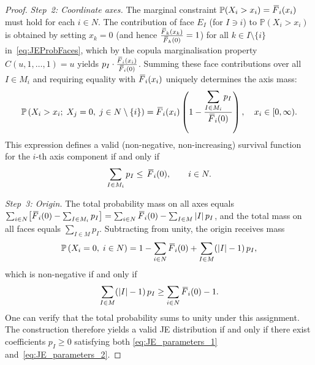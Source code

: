 \documentclass[letterpaper,12pt]{article}
\def \P {\mathbb{P}}
\numberwithin{equation}{section}
\newcommand{\N}{{N}}
\newcommand{\M}{{M}}
\newcommand{\I}{{I}}
\newcommand{\F}{\,\overline{\kern-0.175em F\kern-0em}}
\begin{document}
{\begin{proof}
\smallskip
\noindent\textit{Step~2: Coordinate axes.}
The marginal constraint $\P(X_i>x_i)=\F_i(x_i)$ must hold for each $i\in\N$.
The contribution of face $E_{\I}$ (for $\I\ni i$) to $\P(X_i>x_i)$ is obtained by
setting $x_k=0$ (and hence $\frac{\F_k(x_k)}{\F_k(0)}=1$) for all
$k\in\I\setminus\{i\}$ in~\eqref{eq:JEProbFaces}, which by the copula
marginalisation property $C(u,1,\dots,1)=u$ yields $p_\I\cdot\frac{\F_i(x_i)}{\F_i(0)}$.
Summing these face contributions over all $\I\in\M_i$ and requiring equality with
$\F_i(x_i)$ uniquely determines the axis mass:
\begin{equation}
\label{eq:JEProbAxes}
\P\left(X_i>x_i;\;X_j=0,\;j\in\N\setminus\{i\}\right)
=\F_i(x_i)\left(1-\frac{\displaystyle\sum_{\I\in \M_i}p_{\I}}{\F_i(0)}\right),
\quad x_i\in[0,\infty).
\end{equation}
This expression defines a valid (non-negative, non-increasing) survival function
for the $i$-th axis component if and only if
\begin{equation}
\label{eq:JE_parameters_1}
\sum_{\I\in \M_i}p_{\I}\le\, \F_i(0), \qquad i\in\N.
\end{equation}

\smallskip
\noindent\textit{Step~3: Origin.}
The total probability mass on all axes equals
$\sum_{i\in\N}\bigl[\F_i(0)-\sum_{\I\in\M_i}p_\I\bigr]
=\sum_{i\in\N}\F_i(0)-\sum_{\I\in\M}|\I|\,p_\I$,
and the total mass on all faces equals $\sum_{\I\in\M}p_\I$.
Subtracting from unity, the origin receives mass
\begin{equation}
\label{eq:JEProbOrigin}
\P\left(X_i=0,\;i\in\N\right)
=1-\sum_{i\in\N}\F_i(0)+\sum_{\I\in\M}(|\I|-1)\,p_{\I},
\end{equation}
which is non-negative if and only if
\begin{equation}
\label{eq:JE_parameters_2}
\sum_{\I\in\M}(|\I|-1)\,p_{\I}\ge \sum_{i\in\N}\F_i(0)-1.
\end{equation}
One can verify that the total probability sums to unity under this
assignment. The construction therefore yields a valid JE distribution if and
only if there exist coefficients $p_\I\ge 0$ satisfying both
\eqref{eq:JE_parameters_1} and~\eqref{eq:JE_parameters_2}.


\end{proof}}
\end{document}
